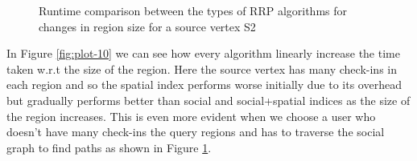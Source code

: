 \begin{figure*}[t]
\begin{subfigure}[t]{0.5\textwidth}
	\caption{Runtime comparison between the types of RRP algorithms for changes in region size for a source vertex S2}
	\label{fig:plot-11}
\end{subfigure}
\caption{Runtime comparison between the types of RRP algorithms for changes in region size for different source verteices}
\end{figure*}

In Figure \ref{fig:plot-10} we can see how every algorithm linearly increase the time taken w.r.t the size of the region. Here the source vertex has many check-ins in each region and so the spatial index performs worse initially due to its overhead but gradually performs better than social and social+spatial indices as the size of the region increases. This is even more evident when we choose a user who doesn't have many check-ins the query regions and has to traverse the social graph to find paths as shown in Figure \ref{fig:plot-11}.
